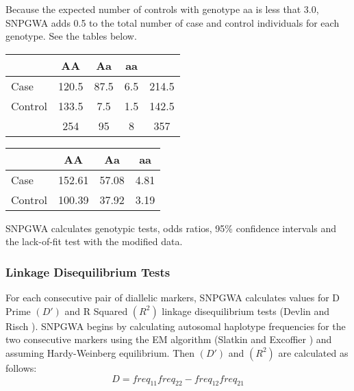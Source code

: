 \begin{enumerate}
Because the expected number of controls with genotype aa is less that 3.0,
SNPGWA adds 0.5 to the total number of case and control individuals for each
genotype.  See the tables below.

\begin{center}
  \begin{tabular}{lcccc}
    \hline
    {}     & \textbf{AA} & \textbf{Aa} & \textbf{aa} & {} \\
    \hline
    Case    & 120.5 & 87.5 & 6.5 & 214.5 \\
    Control & 133.5 &  7.5 & 1.5 & 142.5 \\
    {}    & 254   & 95   & 8 & 357 \\
    \hline
  \end{tabular}
\end{center}

\begin{center}
  \begin{tabular}{lccc}
    \hline
    {}     & \textbf{AA} & \textbf{Aa} & \textbf{aa}  \\
    \hline
    Case    & 152.61      & 57.08       & 4.81 \\
    Control & 100.39      & 37.92       & 3.19 \\
    \hline
  \end{tabular}
\end{center}

SNPGWA calculates genotypic tests, odds ratios, 95\% confidence intervals and
the lack-of-fit test with the modified data.

\end{enumerate}

\subsubsection{Linkage Disequilibrium Tests}
\label{sec:linkage-dis}
For each consecutive pair of diallelic markers, SNPGWA calculates values for D
Prime $\left(D'\right)$ and R Squared $\left(R^2\right)$ linkage disequilibrium
tests (Devlin and Risch \cite{Devlin95}).  SNPGWA begins by calculating
autosomal haplotype frequencies for the two consecutive markers using the EM
algorithm (Slatkin and Excoffier \cite{Slatkin96}) and assuming Hardy-Weinberg
equilibrium.  Then $\left(D'\right)$ and $\left(R^2\right)$ are calculated as
follows:
\begin{equation*}
 D = freq_{11}freq_{22} - freq_{12}freq_{21}
\end{equation*}

